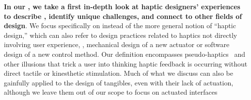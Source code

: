 \textbf{In our , we take a first in-depth look at haptic designers' experiences to describe \haxd, identify  unique challenges, and connect \haxd to other fields of design}.
We focus specifically on \haxd instead of the more general notion of ``haptic design,'' 
which can also refer to design practices related to haptics not directly involving user experience, \eg, mechanical design of a new actuator or software design of a new control method.
Our definition encompasses pseudo-haptics~\citep{Pusch2011} and other illusions that trick a user into thinking haptic feedback is occurring without direct tactile or kinesthetic stimulation.
Much of what we discuss can also be gainfully applied to the design of tangibles, even with their lack of actuation, although we leave them out of our scope to focus on actuated interfaces


